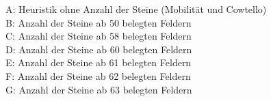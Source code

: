 \small{
A: Heuristik ohne Anzahl der Steine (Mobilität und Cowtello) \\
B: Anzahl der Steine ab 50 belegten Feldern \\
C: Anzahl der Steine ab 58 belegten Feldern \\
D: Anzahl der Steine ab 60 belegten Feldern \\
E: Anzahl der Steine ab 61 belegten Feldern \\
F: Anzahl der Steine ab 62 belegten Feldern \\
G: Anzahl der Steine ab 63 belegten Feldern}

\pagebreak

